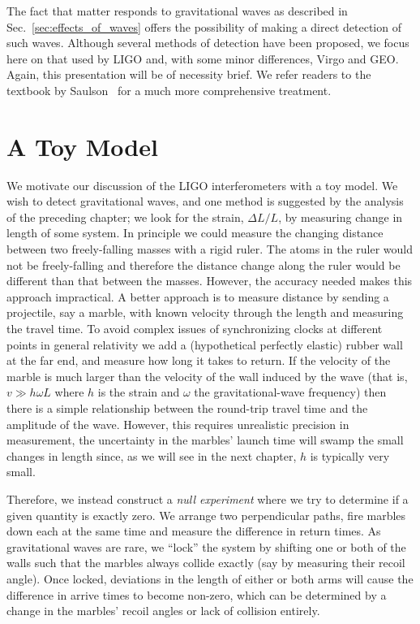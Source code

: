 The fact that matter responds to gravitational waves as described in
Sec.~\ref{sec:effects_of_waves} offers the possibility of making a
direct detection of such waves.  Although several methods of detection
have been proposed, we focus here on that used by LIGO and, with some
minor differences, Virgo and GEO.  Again, this presentation will be of
necessity brief.  We refer readers to the textbook by
Saulson~\cite{Saulson:1994} for a much more comprehensive treatment.

\section{A Toy Model}

We motivate our discussion of the LIGO interferometers with a toy
model.  We wish to detect gravitational waves, and one method is
suggested by the analysis of the preceding chapter; we look for the
strain, $\Delta L/L$, by measuring change in length of some system.
In principle we could measure the changing distance between two
freely-falling masses with a rigid ruler.  The atoms in the ruler
would not be freely-falling and therefore the distance change along
the ruler would be different than that between the masses.  However,
the accuracy needed makes this approach impractical.  A better
approach is to measure distance by sending a projectile, say a marble,
with known velocity through the length and measuring the travel time.
To avoid complex issues of synchronizing clocks at different points in
general relativity we add a (hypothetical perfectly elastic) rubber
wall at the far end, and measure how long it takes to return.  If the
velocity of the marble is much larger than the velocity of the wall
induced by the wave (that is, $v \gg h \omega L$ where $h$ is the
strain and $\omega$ the gravitational-wave frequency) then there is a
simple relationship between the round-trip travel time and the
amplitude of the wave.  However, this requires unrealistic precision
in measurement, the uncertainty in the marbles' launch time will swamp
the small changes in length since, as we will see in the next chapter,
$h$ is typically very small.

Therefore, we instead construct a \emph{null experiment} where we try
to determine if a given quantity is exactly zero.  We arrange two
perpendicular paths, fire marbles down each at the same time and
measure the difference in return times.  As gravitational waves are
rare, we ``lock'' the system by shifting one or both of the walls such
that the marbles always collide exactly (say by measuring their recoil
angle).  Once locked, deviations in the length of either or both arms
will cause the difference in arrive times to become non-zero, which
can be determined by a change in the marbles' recoil angles or lack of
collision entirely.

